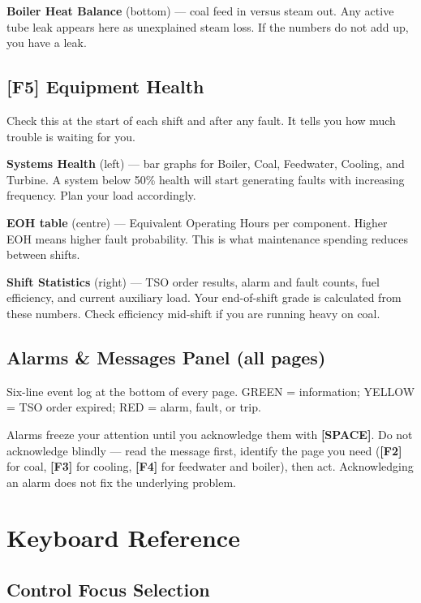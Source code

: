 \documentclass[10pt,a5paper]{article}
\newcommand{\key}[1]{\textbf{[#1]}}
\begin{document}
\textbf{Boiler Heat Balance} (bottom) --- coal feed in versus steam out. Any
active tube leak appears here as unexplained steam loss. If the numbers do not
add up, you have a leak.

\subsection{\key{F5} Equipment Health}

Check this at the start of each shift and after any fault. It tells you how
much trouble is waiting for you.

\textbf{Systems Health} (left) --- bar graphs for Boiler, Coal, Feedwater,
Cooling, and Turbine. A system below 50\% health will start generating faults
with increasing frequency. Plan your load accordingly.

\textbf{EOH table} (centre) --- Equivalent Operating Hours per component.
Higher EOH means higher fault probability. This is what maintenance spending
reduces between shifts.

\textbf{Shift Statistics} (right) --- TSO order results, alarm and fault counts,
fuel efficiency, and current auxiliary load. Your end-of-shift grade is
calculated from these numbers. Check efficiency mid-shift if you are running
heavy on coal.

\subsection{Alarms \& Messages Panel (all pages)}

Six-line event log at the bottom of every page.
GREEN = information; YELLOW = TSO order expired; RED = alarm, fault, or trip.

Alarms freeze your attention until you acknowledge them with \key{SPACE}. Do
not acknowledge blindly --- read the message first, identify the page you need
(\key{F2} for coal, \key{F3} for cooling, \key{F4} for feedwater and boiler),
then act. Acknowledging an alarm does not fix the underlying problem.

\section{Keyboard Reference}

\subsection{Control Focus Selection}
\end{document}
